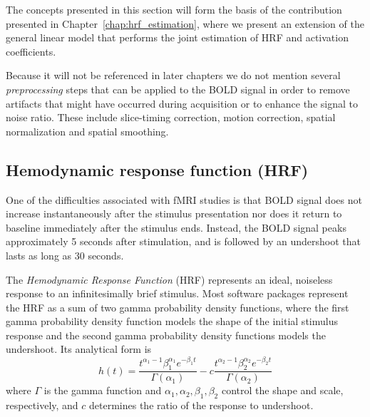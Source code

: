 


The concepts presented in this section will form the basis of the contribution presented in Chapter~\ref{chap:hrf_estimation}, where we present an extension of the general linear model that performs the joint estimation of HRF and activation coefficients. 

Because it will not be referenced in later chapters we do not mention several \emph{preprocessing} steps that can be applied to the BOLD signal in order to remove artifacts that might have occurred during acquisition or to enhance the signal to noise ratio. These include slice-timing correction, motion correction, spatial normalization and spatial smoothing.


\subsection{Hemodynamic response function (HRF)}\label{subsec:hrf}

One of the difficulties associated with fMRI studies is that BOLD signal does not increase instantaneously after the stimulus presentation nor does it return to baseline immediately after the stimulus ends. Instead, the BOLD signal peaks approximately 5 seconds after stimulation, and is followed by an undershoot that lasts as long as 30 seconds.

The \emph{Hemodynamic Response Function} (\gls{HRF}) represents an ideal, noiseless response to an infinitesimally brief stimulus. Most software packages represent the HRF as a sum of two gamma probability density functions, where the first gamma probability density function models the shape of the initial stimulus response and the second gamma probability density functions models the undershoot. Its analytical form is
\begin{equation}
h(t) = \frac{t^{\alpha_1 - 1} \beta_1^{\alpha_1} e^{-\beta_1 t}}{\Gamma(\alpha_1)} - 
c \frac{t^{\alpha_2 - 1} \beta_2^{\alpha_2} e^{-\beta_2 t}}{\Gamma(\alpha_2)}
\end{equation}
where $\Gamma$ is the gamma function and $\alpha_1, \alpha_2, \beta_1, \beta_2$ control the shape and scale, respectively, and $c$ determines the ratio of the response to undershoot.

